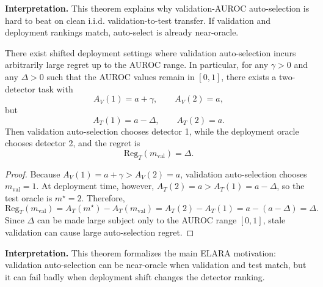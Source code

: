 \medskip
\noindent\textbf{Interpretation.}
This theorem explains why validation-AUROC auto-selection is hard to beat on clean i.i.d. validation-to-test transfer. If validation and deployment rankings match, auto-select is already near-oracle.

\begin{theorem}
\label{thm:stale_validation}
There exist shifted deployment settings where validation auto-selection incurs arbitrarily large regret up to the AUROC range. In particular, for any $\gamma>0$ and any $\Delta>0$ such that the AUROC values remain in $[0,1]$, there exists a two-detector task with
\[
A_V(1)=a+\gamma,\qquad A_V(2)=a,
\]
but
\[
A_T(1)=a-\Delta,\qquad A_T(2)=a.
\]
Then validation auto-selection chooses detector 1, while the deployment oracle chooses detector 2, and the regret is
\[
\mathrm{Reg}_T(m_{\mathrm{val}})=\Delta.
\]
\end{theorem}
\begin{proof}
Because $A_V(1)=a+\gamma>A_V(2)=a$, validation auto-selection chooses $m_{\mathrm{val}}=1$. At deployment time, however, $A_T(2)=a>A_T(1)=a-\Delta$, so the test oracle is $m^\star=2$. Therefore,
\[
\mathrm{Reg}_T(m_{\mathrm{val}}) = A_T(m^\star)-A_T(m_{\mathrm{val}}) = A_T(2)-A_T(1) = a-(a-\Delta) = \Delta.
\]
Since $\Delta$ can be made large subject only to the AUROC range $[0,1]$, stale validation can cause large auto-selection regret.
\end{proof}

\medskip
\noindent\textbf{Interpretation.}
This theorem formalizes the main ELARA motivation: validation auto-selection can be near-oracle when validation and test match, but it can fail badly when deployment shift changes the detector ranking.

